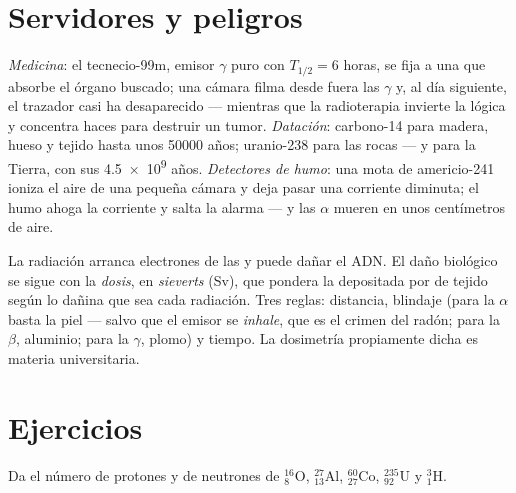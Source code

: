 \section{Servidores y peligros}

\begin{example}\label{ex:g11:nucleus-radioactivity:uses}
\emph{Medicina}: el tecnecio-99m, emisor $\gamma$ puro con
$T_{1/2} = 6$ horas, se fija a una  que absorbe el órgano
buscado; una cámara filma desde fuera las $\gamma$ y, al día siguiente,
el trazador casi ha desaparecido --- mientras que la radioterapia
invierte la lógica y concentra haces para destruir un tumor.
\emph{Datación}: carbono-14 para madera, hueso y tejido hasta unos
\num{50000} años; uranio-238 para las rocas --- y para la Tierra, con
sus \num{4.5e9} años. \emph{Detectores de humo}: una mota de
americio-241 ioniza el aire de una pequeña cámara y deja pasar una
corriente diminuta; el humo ahoga la corriente y salta la alarma --- y
las $\alpha$ mueren en unos centímetros de aire.
\end{example}

\begin{remark}\label{rem:g11:nucleus-radioactivity:dose}
La radiación arranca electrones de las  y puede dañar el ADN.
El daño biológico se sigue con la \emph{dosis}, en
\emph{sieverts} (\unit{Sv}), que pondera la 
depositada por  de tejido según lo dañina que sea cada
radiación. Tres reglas: distancia, blindaje (para la $\alpha$ basta la
piel --- salvo que el emisor se \emph{inhale}, que es el crimen del
radón; para la $\beta$, aluminio; para la $\gamma$, plomo) y tiempo. La
dosimetría propiamente dicha es materia universitaria.
\end{remark}

\section{Ejercicios}

\begin{exercise}[$\star$]\label{exo:g11:nucleus-radioactivity:1}
Da el número de protones y de neutrones de ${}^{16}_{8}\mathrm{O}$,
${}^{27}_{13}\mathrm{Al}$, ${}^{60}_{27}\mathrm{Co}$,
${}^{235}_{92}\mathrm{U}$ y ${}^{3}_{1}\mathrm{H}$.
\end{exercise}

